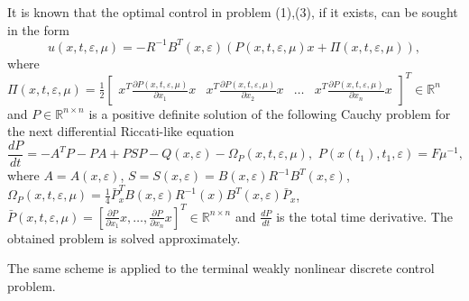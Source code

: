 \documentclass[12pt]{llncs}
\begin{document}
It is known \cite{Heydari2015} that the optimal control in problem (1),(3), if it exists, can be sought in the form
\begin{equation}
	u(x,t,\varepsilon, \mu ) =  - {R^{ - 1}}{B^T}(x,\varepsilon )(P(x,t,\varepsilon, \mu )x + \Pi (x,t,\varepsilon, \mu )),
\end{equation}
where $\Pi (x,t,\varepsilon, \mu) = \frac{1}{2}{\left[ {\begin{array}{*{20}{c}}
			{{x^T}\frac{{\partial P(x,t,\varepsilon,\mu)}}{{\partial {x_1}}}x}&{{x^T}\frac{{\partial P(x,t,\varepsilon,\mu)}}{{\partial {x_2}}}x}& \ldots &{{x^T}\frac{{\partial P(x,t,\varepsilon,\mu)}}{{\partial {x_n}}}x}
	\end{array}} \right]^T} \in {\mathbb{R}^n}$ and $P \in {\mathbb{R}^{n \times n}}$ is a positive definite solution of the following Cauchy problem for the next differential Riccati-like equation
\begin{equation}
	\frac{{dP}}{{dt}} =  - {A^T}P - PA + PSP - Q(x,\varepsilon ) - {\Omega _P}(x,t,\varepsilon, \mu),\,\,P(x({t_1}),{t_1},\varepsilon ) = F{\mu ^{-1}},
\end{equation}
 where $A = A(x,\varepsilon )$, $S = S(x,\varepsilon ) = B(x,\varepsilon ){R^{ - 1}}{B^T}(x,\varepsilon )$, ${\Omega_P}(x,t,\varepsilon,\mu) = \frac{1}{4} \bar{P}_x^T B(x,\varepsilon)R^{-1}(x)B^T(x,\varepsilon)\bar{P}_x$, $\bar {P}(x,t,\varepsilon,\mu)=  \left[\frac{\partial P}{\partial {x_1}}x,\ldots, \frac{\partial P}{\partial {x_n}}x  \right]^T\in {\mathbb{R}^{n \times n}}$ and $\frac{{dP}}{{dt}}$  is the total time derivative.
The obtained problem is solved approximately.

The same scheme is applied to the terminal weakly nonlinear discrete control problem.


\end{document}
